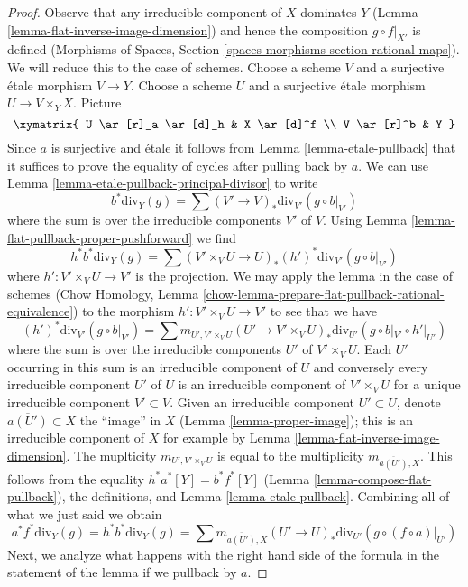 \begin{proof}
Observe that any irreducible component of $X$ dominates $Y$
(Lemma \ref{lemma-flat-inverse-image-dimension})
and hence the composition $g \circ f|_{X'}$ is defined
(Morphisms of Spaces, Section \ref{spaces-morphisms-section-rational-maps}).
We will reduce this to the case of schemes. Choose a scheme $V$ and a
surjective \'etale morphism $V \to Y$. Choose a scheme $U$ and a surjective
\'etale morphism $U \to V \times_Y X$. Picture
$$
\xymatrix{
U \ar[r]_a \ar[d]_h & X \ar[d]^f \\
V \ar[r]^b & Y
}
$$
Since $a$ is surjective and \'etale it follows from
Lemma \ref{lemma-etale-pullback} that it suffices to prove the
equality of cycles after pulling back by $a$.
We can use Lemma \ref{lemma-etale-pullback-principal-divisor} to write
$$
b^*\text{div}_Y(g) = \sum (V' \to V)_*\text{div}_{V'}(g \circ b|_{V'})
$$
where the sum is over the irreducible components $V'$ of $V$.
Using Lemma \ref{lemma-flat-pullback-proper-pushforward} we find
$$
h^*b^*\text{div}_Y(g) =
\sum (V' \times_V U \to U)_*(h')^*\text{div}_{V'}(g \circ b|_{V'})
$$
where $h' : V' \times_V U \to V'$ is the projection.
We may apply the lemma in the case of schemes
(Chow Homology, Lemma
\ref{chow-lemma-prepare-flat-pullback-rational-equivalence})
to the morphism $h' : V' \times_V U \to V'$ to see that we have
$$
(h')^*\text{div}_{V'}(g \circ b|_{V'}) =
\sum
m_{U', V' \times_V U}
(U' \to V' \times_V U)_*\text{div}_{U'}(g \circ b|_{V'} \circ h'|_{U'})
$$
where the sum is over the irreducible components $U'$ of $V' \times_V U$.
Each $U'$ occurring in this sum is an irreducible component of $U$
and conversely every irreducible component $U'$ of $U$ is an
irreducible component of $V' \times_V U$
for a unique irreducible component $V' \subset V$.
Given an irreducible component $U' \subset U$,
denote $\overline{a(U')} \subset X$ the ``image'' in $X$
(Lemma \ref{lemma-proper-image}); this
is an irreducible component of $X$ for example by
Lemma \ref{lemma-flat-inverse-image-dimension}.
The muplticity $m_{U', V' \times_V U}$ is equal to
the multiplicity $m_{\overline{a(U')}, X}$.
This follows from the equality $h^*a^*[Y] = b^*f^*[Y]$
(Lemma \ref{lemma-compose-flat-pullback}), the definitions, and
Lemma \ref{lemma-etale-pullback}.
Combining all of what we just said we obtain
$$
a^*f^*\text{div}_Y(g) =
h^*b^*\text{div}_Y(g) =
\sum m_{\overline{a(U')}, X}
(U' \to U)_*\text{div}_{U'}(g \circ (f \circ a)|_{U'})
$$
Next, we analyze what happens with the right hand side of the
formula in the statement of the lemma if we pullback by $a$.

\end{proof}
